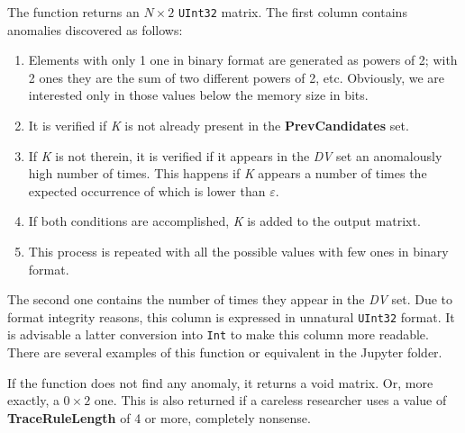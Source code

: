 \begin{itemize}
\begin{itemize}
	 \end{itemize}
	 
	 The function returns an \(N\times 2\) \texttt{UInt32} matrix. The first column contains anomalies discovered as follows:
	 
	 \begin{enumerate}
	 	\item Elements with only 1 one in binary format are generated as powers of 2; with 2 ones they are the sum of two different powers of 2, etc. Obviously, we are interested only in those values below the memory size in bits.
	 	\item It is verified if \textit{K} is not already present in the \textbf{PrevCandidates} set.
	 	\item If \textit{K} is not therein, it is verified if it appears in the \textit{DV} set an anomalously high number of times. This happens if \textit{K} appears a number of times the expected occurrence of which is lower than \textbf{\(\varepsilon\)}.
	 	\item If both conditions are accomplished, \textit{K} is added to the output matrixt.
	 	\item This process is repeated with all the possible values with few ones in binary format.
	 \end{enumerate}
	 
	 The second one contains the number of times they appear in the \textit{DV} set. Due to format integrity reasons, this column is expressed in unnatural \texttt{UInt32} format. 	 
	 It is advisable a latter conversion into \texttt{Int} to make this column more readable. There are several examples of this function or equivalent in the Jupyter folder.
	 
	 If the function does not find any anomaly, it returns a void matrix.  Or, more exactly, a \(0\times 2\) one. This is also returned if a careless researcher uses a value of \textbf{TraceRuleLength} of 4 or more, completely nonsense.
	 
\end{itemize}
%

